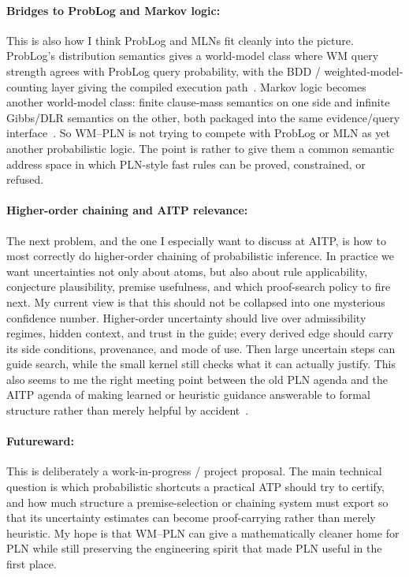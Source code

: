 \documentclass{easychair}
\begin{document}
\paragraph*{Bridges to ProbLog and Markov logic:}
This is also how I think ProbLog and MLNs fit cleanly into the picture.  ProbLog's distribution semantics gives a world-model class where WM query strength agrees with ProbLog query probability, with the BDD / weighted-model-counting layer giving the compiled execution path~\cite{problog}.  Markov logic becomes another world-model class: finite clause-mass semantics on one side and infinite Gibbs/DLR semantics on the other, both packaged into the same evidence/query interface~\cite{mln}.  So WM--PLN is not trying to compete with ProbLog or MLN as yet another probabilistic logic.  The point is rather to give them a common semantic address space in which PLN-style fast rules can be proved, constrained, or refused.

\vspace{-3mm}
\paragraph*{Higher-order chaining and AITP relevance:}
The next problem, and the one I especially want to discuss at AITP, is how to most correctly do higher-order chaining of probabilistic inference.  In practice we want uncertainties not only about atoms, but also about rule applicability, conjecture plausibility, premise usefulness, and which proof-search policy to fire next.  My current view is that this should not be collapsed into one mysterious confidence number.  Higher-order uncertainty should live over admissibility regimes, hidden context, and trust in the guide; every derived edge should carry its side conditions, provenance, and mode of use.  Then large uncertain steps can guide search, while the small kernel still checks what it can actually justify.  This also seems to me the right meeting point between the old PLN agenda and the AITP agenda of making learned or heuristic guidance answerable to formal structure rather than merely helpful by accident~\cite{malarea,enigma}.

\vspace{-3mm}
\paragraph*{Futureward:}
This is deliberately a work-in-progress / project proposal.  The main technical question is which probabilistic shortcuts a practical ATP should try to certify, and how much structure a premise-selection or chaining system must export so that its uncertainty estimates can become proof-carrying rather than merely heuristic.  My hope is that WM--PLN can give a mathematically cleaner home for PLN while still preserving the engineering spirit that made PLN useful in the first place.
\end{document}
